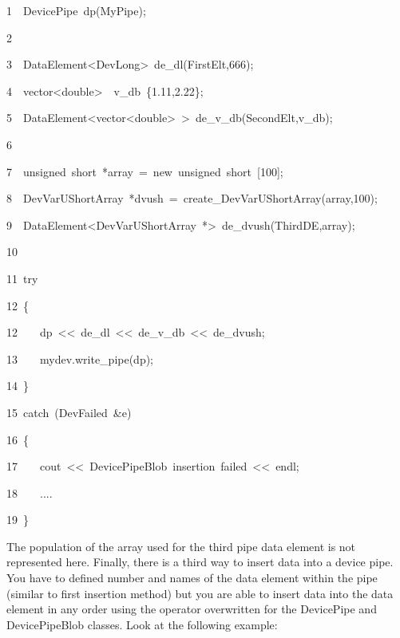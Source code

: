
\begin{lyxcode}
1~~DevicePipe~dp(\textquotedbl{}MyPipe\textquotedbl{});

2

3~~DataElement<DevLong>~de\_dl(\textquotedbl{}FirstElt\textquotedbl{},666);~~

4~~vector<double>~~v\_db~\{1.11,2.22\};

5~~DataElement<vector<double>~>~de\_v\_db(\textquotedbl{}SecondElt,v\_db);

6

7~~unsigned~short~{*}array~=~new~unsigned~short~{[}100{]};

8~~DevVarUShortArray~{*}dvush~=~create\_DevVarUShortArray(array,100);

9~~DataElement<DevVarUShortArray~{*}>~de\_dvush(\textquotedbl{}ThirdDE\textquotedbl{},array);

10

11~try~~

12~\{~~~~~

12~~~~dp~<\textcompwordmark{}<~de\_dl~<\textcompwordmark{}<~de\_v\_db~<\textcompwordmark{}<~de\_dvush;

13~~~~mydev.write\_pipe(dp);

14~\}

15~catch~(DevFailed~\&e)

16~\{~~~~~

17~~~~cout~<\textcompwordmark{}<~\textquotedbl{}DevicePipeBlob~insertion~failed\textquotedbl{}~<\textcompwordmark{}<~endl;~~~~~

18~~~~....~~

19~\}
\end{lyxcode}


The population of the array used for the third pipe data element is
not represented here. Finally, there is a third way to insert data
into a device pipe. You have to defined number and names of the data
element within the pipe (similar to first insertion method) but you
are able to insert data into the data element in any order using the
\textquotedbl{}{[}{]}\textquotedbl{} operator overwritten for the
DevicePipe and DevicePipeBlob classes. Look at the following example:

